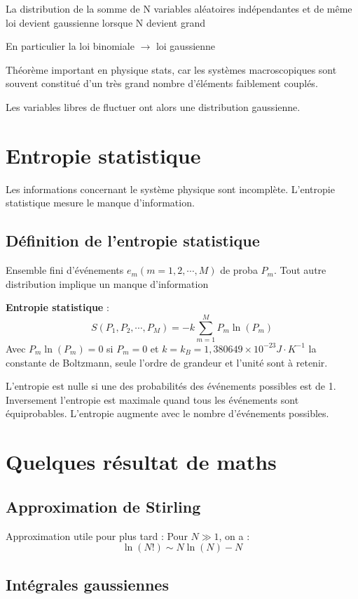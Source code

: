\documentclass[12pt,a4paper]{report}
\begin{document}
La distribution de la somme de N variables aléatoires indépendantes et de même loi devient gaussienne lorsque N devient grand

En particulier la loi binomiale \(\rightarrow\) loi gaussienne

Théorème important en physique stats, car les systèmes macroscopiques sont souvent constitué d'un très grand nombre d'éléments faiblement couplés.

Les variables libres de fluctuer ont alors une distribution gaussienne.

\section{Entropie statistique}

Les informations concernant le système physique sont incomplète.
L'entropie statistique mesure le manque d'information.

\subsection{Définition de l'entropie statistique}

Ensemble fini d'événements \(e_m (m = 1,2, \cdots , M)\) de proba \(P_m\).
Tout autre distribution implique un manque d'information

\textbf{Entropie statistique} :
\[
	S(P_1, P_2, \cdots, P_M) = -k \sum_{m=1}^M P_m \ln(P_m)
\]
Avec \(P_m \ln(P_m) = 0\) si \(P_m = 0\) et \(k = k_B = 1,380649 \times 10^{-23} J\cdot K^{-1}\) la constante de Boltzmann, seule l'ordre de grandeur et l'unité sont à retenir.

L'entropie est nulle si une des probabilités des événements possibles est de 1. Inversement l'entropie est maximale quand tous les événements sont équiprobables. L'entropie augmente avec le nombre d'événements possibles.

\section{Quelques résultat de maths}

\subsection{Approximation de Stirling}

Approximation utile pour plus tard :
Pour \(N \gg 1\), on a :
\[
	\ln(N!) \sim N \ln(N) - N
\]

\subsection{Intégrales gaussiennes}
\end{document}
